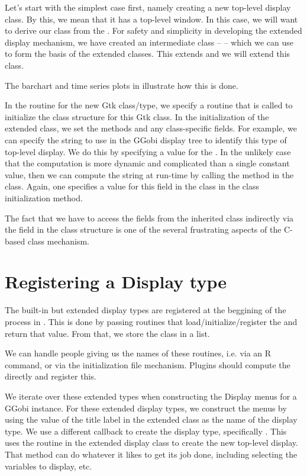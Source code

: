 \documentclass{article}
\begin{document}
Let's start with the simplest case first, namely creating a new
top-level display class.  By this, we mean that it has a top-level
window.  In this case, we will want to derive our class from the
.  For safety and simplicity in
developing the extended display mechanism, we have created an
intermediate class --  -- which
we can use to form the basis of the extended classes.  This extends
 and we will extend this class.

The barchart and time series plots in 
illustrate how this is done.

In the  routine for the new Gtk class/type, we
specify a routine that is called to initialize the class structure for
this Gtk class.  In the initialization of the extended class, we set
the methods and any class-specific fields.  For example, we can
specify the string to use in the GGobi display tree to identify this
type of top-level display.  We do this by specifying a value for the
. In the unlikely case that the computation is more
dynamic and complicated than a single constant value, then we can
compute the string at run-time by calling the 
method in the class. Again, one specifies a value for this field in
the class in the class initialization method.

The fact that we have to access the fields from the inherited class
indirectly via the  field in the class structure
is one of the several frustrating aspects of the C-based class
mechanism.


\section{Registering a Display type}

The built-in but extended display types are registered at the
beggining of the process in .  This is done by
passing routines that load/initialize/register the  and
return that value. From that, we store the class in a list.

We can handle people giving us the names of these routines,
i.e. via an R command, or via the initialization file
mechanism. Plugins should compute the 
directly and register this.


We iterate over these extended types when constructing the Display
menus for a GGobi instance. For these extended display types, we
construct the menus by using the value of the title label in the
extended class as the name of the display type.  We use a different
callback to create the display type, specifically
.  This uses the 
routine in the extended display class to create the new top-level
display.  That  method can do whatever it likes
to get its job done, including selecting the variables to display, etc.
\end{document}
